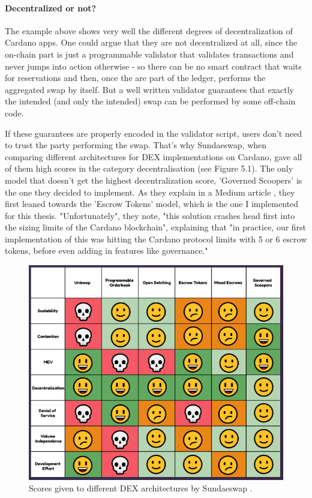 \documentclass[a4paper,twoside,12pt]{report}
\begin{document}
\paragraph{Decentralized or not?}
The example above shows very well the different degrees of decentralization of Cardano apps. One could argue that they are not decentralized at all, since the on-chain part is just a programmable validator that validates transactions and never jumps into action otherwise - so there can be no smart contract that waits for reservations and then, once the are part of the ledger, performs the aggregated swap by itself. But a well written validator guarantees that exactly the intended (and only the intended) swap can be performed by some off-chain code. 

If these guarantees are properly encoded in the validator script, users don't need to trust the party performing the swap. That's why Sundaeswap, when comparing different architectures for DEX implementations on Cardano, gave all of them high scores in the category decentralisation (see Figure 5.1). The only model that doesn't get the highest decentralization score, 'Governed Scoopers' is the one they decided to implement. As they explain in a Medium article \cite{sundaeswapScooperModel}, they first leaned towards the 'Escrow Tokens' model, which is the one I implemented for this thesis. "Unfortunately", they note, "this solution crashes head first into the sizing limits of the Cardano blockchain", explaining that "in practice, our first implementation of this was hitting the Cardano protocol limits with 5 or 6 escrow tokens, before even adding in features like governance."

\begin{figure}[h]
\centering
\includegraphics[scale=0.6]{comparison_sundaeswap}
\caption{Scores given to different DEX architectures by Sundaeswap \cite{sundaeswapScooperModel}.}
\end{figure} 
\end{document}
